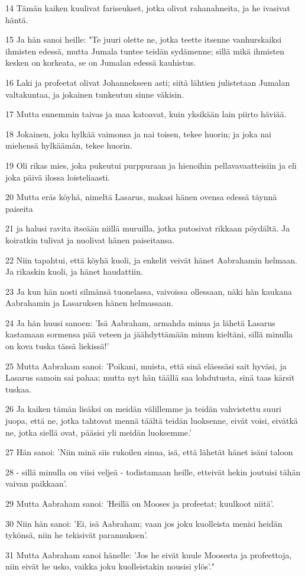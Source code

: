 \par 14 Tämän kaiken kuulivat fariseukset, jotka olivat rahanahneita, ja he ivasivat häntä.
\par 15 Ja hän sanoi heille: "Te juuri olette ne, jotka teette itsenne vanhurskaiksi ihmisten edessä, mutta Jumala tuntee teidän sydämenne; sillä mikä ihmisten kesken on korkeata, se on Jumalan edessä kauhistus.
\par 16 Laki ja profeetat olivat Johannekseen asti; siitä lähtien julistetaan Jumalan valtakuntaa, ja jokainen tunkeutuu sinne väkisin.
\par 17 Mutta ennemmin taivas ja maa katoavat, kuin yksikään lain piirto häviää.
\par 18 Jokainen, joka hylkää vaimonsa ja nai toisen, tekee huorin; ja joka nai miehensä hylkäämän, tekee huorin.
\par 19 Oli rikas mies, joka pukeutui purppuraan ja hienoihin pellavavaatteisiin ja eli joka päivä ilossa loisteliaasti.
\par 20 Mutta eräs köyhä, nimeltä Lasarus, makasi hänen ovensa edessä täynnä paiseita
\par 21 ja halusi ravita itseään niillä muruilla, jotka putosivat rikkaan pöydältä. Ja koiratkin tulivat ja nuolivat hänen paiseitansa.
\par 22 Niin tapahtui, että köyhä kuoli, ja enkelit veivät hänet Aabrahamin helmaan. Ja rikaskin kuoli, ja hänet haudattiin.
\par 23 Ja kun hän nosti silmänsä tuonelassa, vaivoissa ollessaan, näki hän kaukana Aabrahamin ja Lasaruksen hänen helmassaan.
\par 24 Ja hän huusi sanoen: 'Isä Aabraham, armahda minua ja lähetä Lasarus kastamaan sormensa pää veteen ja jäähdyttämään minun kieltäni, sillä minulla on kova tuska tässä liekissä!'
\par 25 Mutta Aabraham sanoi: 'Poikani, muista, että sinä eläessäsi sait hyväsi, ja Lasarus samoin sai pahaa; mutta nyt hän täällä saa lohdutusta, sinä taas kärsit tuskaa.
\par 26 Ja kaiken tämän lisäksi on meidän välillemme ja teidän vahvistettu suuri juopa, että ne, jotka tahtovat mennä täältä teidän luoksenne, eivät voisi, eivätkä ne, jotka siellä ovat, pääsisi yli meidän luoksemme.'
\par 27 Hän sanoi: 'Niin minä siis rukoilen sinua, isä, että lähetät hänet isäni taloon
\par 28 - sillä minulla on viisi veljeä - todistamaan heille, etteivät hekin joutuisi tähän vaivan paikkaan'.
\par 29 Mutta Aabraham sanoi: 'Heillä on Mooses ja profeetat; kuulkoot niitä'.
\par 30 Niin hän sanoi: 'Ei, isä Aabraham; vaan jos joku kuolleista menisi heidän tykönsä, niin he tekisivät parannuksen'.
\par 31 Mutta Aabraham sanoi hänelle: 'Jos he eivät kuule Moosesta ja profeettoja, niin eivät he usko, vaikka joku kuolleistakin nousisi ylös'."

